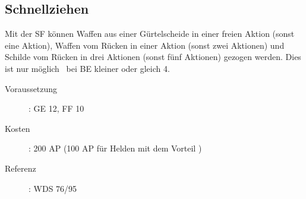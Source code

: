 \subsection{Schnellziehen}
\label{sf.schnellziehen}
Mit der SF  können Waffen aus einer Gürtelscheide in einer freien Aktion (sonst eine Aktion), Waffen vom Rücken in einer Aktion (sonst zwei Aktionen) und Schilde vom Rücken in drei Aktionen (sonst fünf Aktionen) gezogen werden.
Dies ist nur möglich \ bei BE kleiner oder gleich 4.
\begin{description}
    \item[Voraussetzung]:
        GE 12, FF 10
    \item [Kosten]:
        200 AP (100 AP für Helden mit dem Vorteil )
    \item [Referenz]:
        WDS 76/95
\end{description}
